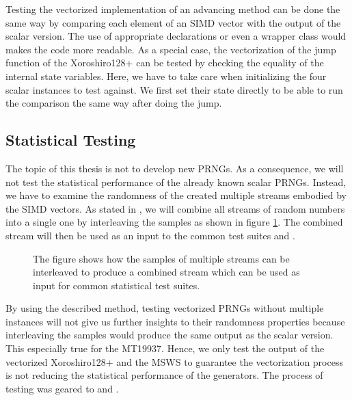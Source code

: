 \documentclass{stdlocal}
\begin{document}
    Testing the vectorized implementation of an advancing method can be done the same way by comparing each element of an SIMD vector with the output of the scalar version.
    The use of appropriate  declarations or even a wrapper class would makes the code more readable.
    As a special case, the vectorization of the jump function of the Xoroshiro128+ can be tested by checking the equality of the internal state variables.
    Here, we have to take care when initializing the four scalar instances to test against.
    We first set their state directly to be able to run the comparison the same way after doing the jump.

  \subsection{Statistical Testing} %
  \label{sub:statistical_testing}
    The topic of this thesis is not to develop new PRNGs.
    As a consequence, we will not test the statistical performance of the already known scalar PRNGs.
    Instead, we have to examine the randomness of the created multiple streams embodied by the SIMD vectors.
    As stated in \textcite[\ppno~160-162]{kneusel2018}, we will combine all streams of random numbers into a single one by interleaving the samples as shown in figure \ref{fig:combined-stream}.
    The combined stream will then be used as an input to the common test suites  and  \autocite{testu01,dieharder}.
    \begin{figure}
      \center
      \caption[Combined Stream by Interleaving Samples of Multiple Streams]{%
        The figure shows how the samples of multiple streams can be interleaved to produce a combined stream which can be used as input for common statistical test suites.
      }
      \label{fig:combined-stream}
    \end{figure}

    By using the described method, testing vectorized PRNGs without multiple instances will not give us further insights to their randomness properties because interleaving the samples would produce the same output as the scalar version.
    This especially true for the MT19937.
    Hence, we only test the output of the vectorized Xoroshiro128+ and the MSWS to guarantee the vectorization process is not reducing the statistical performance of the generators.
    The process of testing was geared to \textcite[\ppno~141-155]{kneusel2018} and \textcite{oneill-blog-testu01}.
\end{document}
